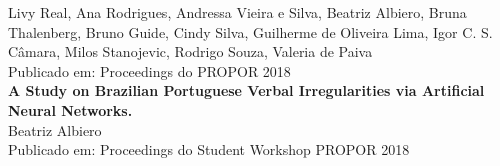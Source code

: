 Livy Real, Ana Rodrigues, Andressa Vieira e Silva, Beatriz Albiero, Bruna Thalenberg, Bruno Guide, Cindy Silva, Guilherme de Oliveira Lima, Igor C. S. Câmara, Milos Stanojevic, Rodrigo Souza, Valeria de Paiva\\

Publicado em: Proceedings do PROPOR 2018\\

\textbf{A Study on Brazilian Portuguese Verbal Irregularities via Artificial Neural Networks.}\\

Beatriz Albiero\\

Publicado em: Proceedings do Student Workshop PROPOR 2018
